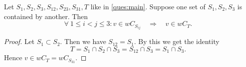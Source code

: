 \begin{prop}
	Let $S_1,S_2,S_3,S_{12},S_{23},S_{31},T$ like in \ref{ques:main}. Suppose one set of $S_1,S_2,S_3$ is contained by another. Then
	$$ \forall \ 1 \leq i < j \leq 3 : v \in w C_{S_{ij}} \quad \Rightarrow \quad v \in w C_T. $$

	\begin{proof}
		Let $S_1 \subset S_2$. Then we have $S_{12} = S_1$. By this we get the identity
		$$ T = S_1 \cap S_2 \cap S_3 = S_{12} \cap S_3 = S_1 \cap S_3. $$
		Hence $v \in w C_T = w C_{S_{31}}$.
	\end{proof}
\end{prop}